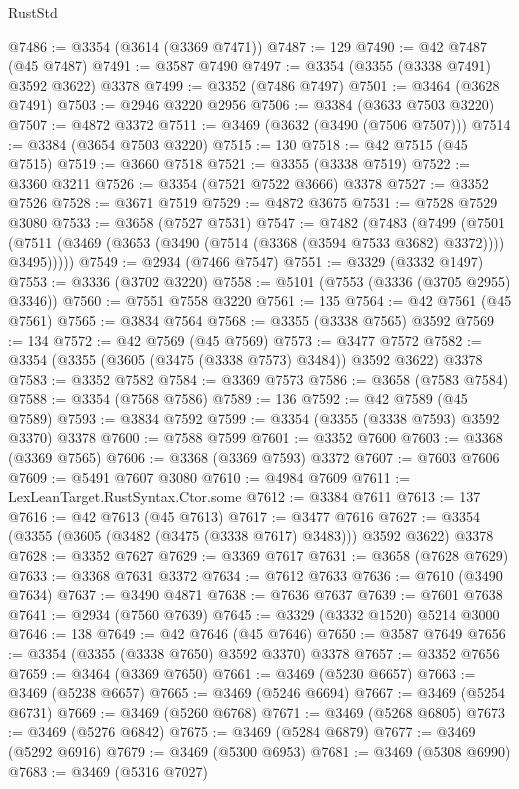 \begin{lexlean}{RustStd}
\begin{coremodule}
@7486 := @3354 (@3614 (@3369 @7471))
@7487 := 129
@7490 := @42 @7487 (@45 @7487)
@7491 := @3587 @7490
@7497 := @3354 (@3355 (@3338 @7491) @3592 @3622) @3378
@7499 := @3352 (@7486 @7497)
@7501 := @3464 (@3628 @7491)
@7503 := @2946 @3220 @2956
@7506 := @3384 (@3633 @7503 @3220)
@7507 := @4872 @3372
@7511 := @3469 (@3632 (@3490 (@7506 @7507)))
@7514 := @3384 (@3654 @7503 @3220)
@7515 := 130
@7518 := @42 @7515 (@45 @7515)
@7519 := @3660 @7518
@7521 := @3355 (@3338 @7519)
@7522 := @3360 @3211
@7526 := @3354 (@7521 @7522 @3666) @3378
@7527 := @3352 @7526
@7528 := @3671 @7519
@7529 := @4872 @3675
@7531 := @7528 @7529 @3080
@7533 := @3658 (@7527 @7531)
@7547 := @7482
    (@7483
      (@7499
        (@7501 (@7511 (@3469 (@3653 (@3490 (@7514 (@3368 (@3594 @7533 @3682) @3372)))) @3495)))))
@7549 := @2934 (@7466 @7547)
@7551 := @3329 (@3332 @1497)
@7553 := @3336 (@3702 @3220)
@7558 := @5101 (@7553 (@3336 (@3705 @2955) @3346))
@7560 := @7551 @7558 @3220
@7561 := 135
@7564 := @42 @7561 (@45 @7561)
@7565 := @3834 @7564
@7568 := @3355 (@3338 @7565) @3592
@7569 := 134
@7572 := @42 @7569 (@45 @7569)
@7573 := @3477 @7572
@7582 := @3354 (@3355 (@3605 (@3475 (@3338 @7573) @3484)) @3592 @3622) @3378
@7583 := @3352 @7582
@7584 := @3369 @7573
@7586 := @3658 (@7583 @7584)
@7588 := @3354 (@7568 @7586)
@7589 := 136
@7592 := @42 @7589 (@45 @7589)
@7593 := @3834 @7592
@7599 := @3354 (@3355 (@3338 @7593) @3592 @3370) @3378
@7600 := @7588 @7599
@7601 := @3352 @7600
@7603 := @3368 (@3369 @7565)
@7606 := @3368 (@3369 @7593) @3372
@7607 := @7603 @7606
@7609 := @5491 @7607 @3080
@7610 := @4984 @7609
@7611 := LexLeanTarget.RustSyntax.Ctor.some
@7612 := @3384 @7611
@7613 := 137
@7616 := @42 @7613 (@45 @7613)
@7617 := @3477 @7616
@7627 := @3354 (@3355 (@3605 (@3482 (@3475 (@3338 @7617) @3483))) @3592 @3622) @3378
@7628 := @3352 @7627
@7629 := @3369 @7617
@7631 := @3658 (@7628 @7629)
@7633 := @3368 @7631 @3372
@7634 := @7612 @7633
@7636 := @7610 (@3490 @7634)
@7637 := @3490 @4871
@7638 := @7636 @7637
@7639 := @7601 @7638
@7641 := @2934 (@7560 @7639)
@7645 := @3329 (@3332 @1520) @5214 @3000
@7646 := 138
@7649 := @42 @7646 (@45 @7646)
@7650 := @3587 @7649
@7656 := @3354 (@3355 (@3338 @7650) @3592 @3370) @3378
@7657 := @3352 @7656
@7659 := @3464 (@3369 @7650)
@7661 := @3469 (@5230 @6657)
@7663 := @3469 (@5238 @6657)
@7665 := @3469 (@5246 @6694)
@7667 := @3469 (@5254 @6731)
@7669 := @3469 (@5260 @6768)
@7671 := @3469 (@5268 @6805)
@7673 := @3469 (@5276 @6842)
@7675 := @3469 (@5284 @6879)
@7677 := @3469 (@5292 @6916)
@7679 := @3469 (@5300 @6953)
@7681 := @3469 (@5308 @6990)
@7683 := @3469 (@5316 @7027)

\end{coremodule}
\end{lexlean}
